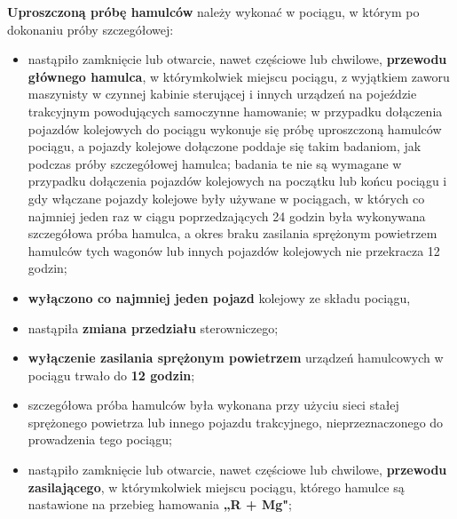 \textbf{Uproszczoną próbę hamulców} należy wykonać w pociągu, w którym po dokonaniu próby szczegółowej:
\begin{itemize}
	\item nastąpiło zamknięcie lub otwarcie, nawet częściowe lub chwilowe, \textbf{przewodu głównego hamulca}, w którymkolwiek miejscu pociągu, z wyjątkiem zaworu maszynisty w czynnej kabinie sterującej i innych urządzeń na pojeździe trakcyjnym powodujących samoczynne hamowanie; w przypadku dołączenia pojazdów kolejowych do pociągu wykonuje się próbę uproszczoną hamulców pociągu, a pojazdy kolejowe dołączone poddaje się takim badaniom, jak podczas próby szczegółowej hamulca; badania te nie są wymagane w przypadku dołączenia pojazdów kolejowych na początku lub końcu pociągu i gdy włączane pojazdy kolejowe były używane w pociągach, w których co najmniej jeden raz w ciągu poprzedzających 24 godzin była wykonywana szczegółowa próba hamulca, a okres braku zasilania sprężonym powietrzem hamulców tych wagonów lub innych pojazdów kolejowych nie przekracza 12 godzin; 
	\item \textbf{wyłączono co najmniej jeden pojazd} kolejowy ze składu pociągu, 
	\item nastąpiła \textbf{zmiana przedziału} sterowniczego; 
	\item \textbf{wyłączenie zasilania sprężonym powietrzem} urządzeń hamulcowych w pociągu trwało do \textbf{12 godzin}; 
	\item szczegółowa próba hamulców była wykonana przy użyciu sieci stałej sprężonego powietrza lub innego pojazdu trakcyjnego, nieprzeznaczonego do prowadzenia tego pociągu; 
	\item nastąpiło zamknięcie lub otwarcie, nawet częściowe lub chwilowe, \textbf{przewodu zasilającego}, w którymkolwiek miejscu pociągu, którego hamulce są nastawione na przebieg hamowania \textbf{„R + Mg"};
\end{itemize}


